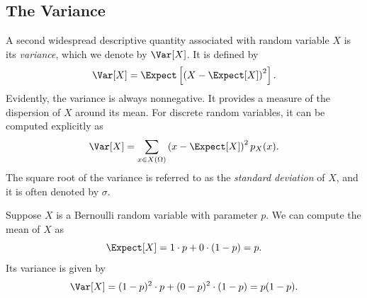 \subsection{The Variance}

A second widespread descriptive quantity associated with random variable $X$ is its \emph{variance}, which we denote by $\Var [X]$. 
It is defined by
\begin{equation} \label{equation:VarianceExplicit}
\Var [X] = \Expect \left[ \left( X - \Expect [X] \right)^2 \right] .
\end{equation}
Evidently, the variance is always nonnegative.
It provides a measure of the dispersion of $X$ around its mean.
For discrete random variables, it can be computed explicitly as
\begin{equation*}
\Var [X] = \sum_{x \in X(\Omega)} \left( x - \Expect [X] \right)^2 p_X (x) .
\end{equation*}
The square root of the variance is referred to as the \emph{standard deviation} of $X$, and it is often denoted by $\sigma$. 

\begin{example}
Suppose $X$ is a Bernoulli random variable with parameter $p$.
We can compute the mean of $X$ as
\begin{equation*}
\Expect [X] = 1 \cdot p + 0 \cdot (1 - p) = p .
\end{equation*}
Its variance is given by
\begin{equation*}
\Var [X] = (1 - p)^2 \cdot p + (0 - p)^2 \cdot (1 - p)
= p (1 - p) .
\end{equation*}
\end{example}

